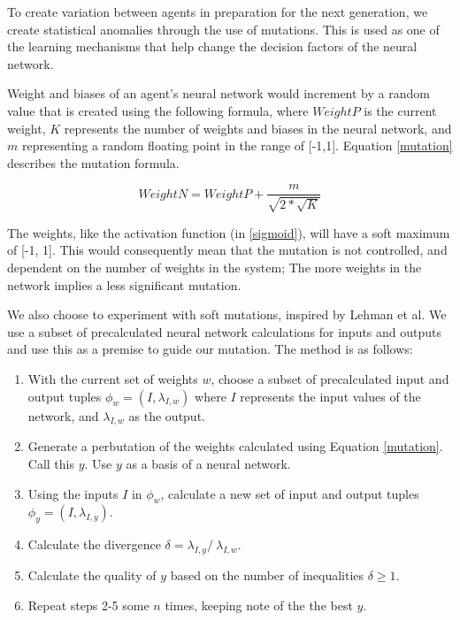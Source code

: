 \documentclass[12pt,a4paper]{article}
\begin{document}
            To create variation between agents in preparation for the next generation, we create statistical anomalies through the use of mutations. This is used as one of the learning mechanisms that help change the decision factors of the neural network.

            Weight and biases of an agent's neural network would increment by a random value that is created using the following formula, where $WeightP$ is the current weight, $K$ represents the number of weights and biases in the neural network, and $m$ representing a random floating point in the range of [-1,1]. Equation \ref{mutation} describes the mutation formula.

            \begin{equation} \label{mutation}
                WeightN = WeightP + \frac{m}{\sqrt{2 * \sqrt{K} }}
            \end{equation}

            The weights, like the activation function (in \ref{sigmoid}), will have a soft maximum of [-1, 1]. This would consequently mean that the mutation is not controlled, and dependent on the number of weights in the system; The more weights in the network implies a less significant mutation.
            
             We also choose to experiment with soft mutations, inspired by Lehman et al. \cite{lehman_safe_2017} We use a subset of precalculated neural network calculations for inputs and outputs and use this as a premise to guide our mutation. The method is as follows:
             
             \begin{enumerate}
             \item With the current set of weights $w$, choose a subset of precalculated input and output tuples $\phi_{w} = (I, \lambda_{I,w})$ where $I$ represents the input values of the network, and $\lambda_{I,w}$ as the output.
             \item Generate a perbutation of the weights calculated using Equation \ref{mutation}. Call this $y$. Use $y$ as a basis of a neural network. 
              \item Using the inputs $I$ in $\phi_{w}$, calculate a new set of input and output tuples $\phi_{y} = (I, \lambda_{I,y})$.
              \item Calculate the divergence $\delta = \lambda_{I,y} /\ \lambda_{I,w}.$ 
              \item Calculate the quality of $y$ based on the number of inequalities $\delta \geq 1$.
             \item Repeat steps 2-5 some $n$ times, keeping note of the the best $y$. 
             \end{enumerate}
\end{document}
